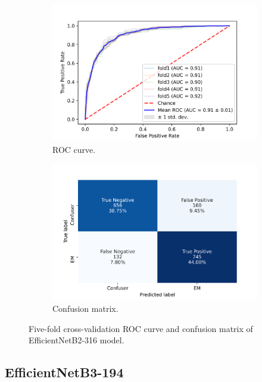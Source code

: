 \begin{figure}[h!]
	\centering
	\begin{subfigure}[b]{0.49\textwidth}
		\centering
		\includegraphics[width=\textwidth,keepaspectratio]{images/Supplement4/image182.png}
		\caption{ROC curve.}
	\end{subfigure}
	\hfill
	\begin{subfigure}[b]{0.49\textwidth}
		\centering
		\includegraphics[width=\textwidth,keepaspectratio]{images/Supplement4/image187.png}
		\caption{Confusion matrix.}
	\end{subfigure}
	\caption{Five-fold cross-validation ROC curve and confusion matrix of EfficientNetB2-316 model.}
\end{figure}

\vfill\clearpage
\subsection{EfficientNetB3-194}


